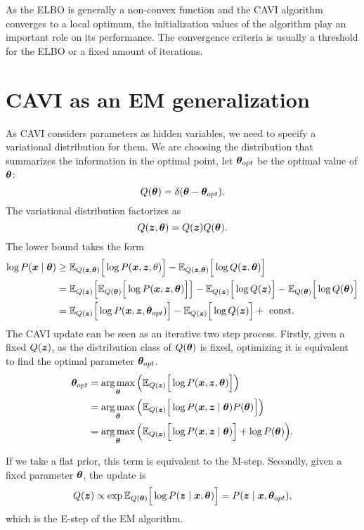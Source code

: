 As the ELBO is generally a non-convex function and the CAVI algorithm converges to a local optimum, the initialization values of the algorithm play an important role on its performance. The convergence criteria is usually a threshold for the ELBO or a fixed amount of iterations.

\section{CAVI as an EM generalization}\label{sec:CAVI_EM}

As CAVI considers parameters as hidden variables, we need to specify a variational distribution for them. We are choosing the distribution that summarizes the information in the optimal point, let \(\bm{\theta}_{opt}\) be the optimal value of \(\bm{\theta}\):
\[
  Q(\bm{\theta}) = \delta(\bm{\theta} - \bm{\theta}_{opt}).
\]
The variational distribution factorizes as
\[
  Q(\bm{z}, \bm{\theta}) = Q(\bm{z})Q(\bm{\theta}).
\]
The lower bound takes the form
\[
  \begin{aligned}
    \log{P(\bm{x}\mid \bm{\theta})} &\geq \mathbb{E}_{Q(\bm{z}, \bm{\theta})}\Big[\log{P(\bm{x}, \bm{z}, \theta)}\Big] - \mathbb{E}_{Q(\bm{z}, \bm{\theta})}\Big[\log{Q(\bm{z}, \bm{\theta})}\Big] \\
    &= \mathbb{E}_{Q(\bm{z})}\Big[\mathbb{E}_{Q(\bm{\theta})}\Big[\log{P(\bm{x}, \bm{z}, \bm{\theta})}\Big]\Big] - \mathbb{E}_{Q(\bm{z})}\Big[\log{Q(\bm{z})}\Big] - \mathbb{E}_{Q(\bm{\theta})}\Big[\log{Q(\bm{\theta})}\Big] \\
    &= \mathbb{E}_{Q(\bm{z})}\Big[\log{P(\bm{x}, \bm{z}, \bm{\theta}_{opt})}\Big] - \mathbb{E}_{Q(\bm{z})}\Big[\log{Q(\bm{z})}\Big] + \text{ const. }
  \end{aligned}
\]
The CAVI update can be seen as an iterative two step process. Firstly, given a fixed \(Q(\bm{z})\), as the distribution class of \(Q(\bm{\theta})\) is fixed, optimizing it is equivalent to find the optimal parameter \(\bm{\theta}_{opt}\). 
\[
  \begin{aligned}
    \bm{\theta}_{opt} &= \operatorname*{arg\,max}_{\bm{\theta}} \Big( \mathbb{E}_{Q(\bm{z})}\Big[\log{P(\bm{x},\bm{z},\bm{\theta})}\Big] \Big)\\
    &=  \operatorname*{arg\,max}_{\bm{\theta}} \Big( \mathbb{E}_{Q(\bm{z})}\Big[\log{P(\bm{x}, \bm{z}\mid \bm{\theta})P(\bm{\theta})}\Big] \Big) \\
    &= \operatorname*{arg\,max}_{\bm{\theta}} \Big( \mathbb{E}_{Q(\bm{z})}\Big[\log{P(\bm{x}, \bm{z}\mid \bm{\theta})}\Big] + \log{P(\bm{\theta})} \Big). \\
  \end{aligned}
\]

If we take a flat prior, this term is equivalent to the M-step. Secondly, given a fixed parameter \(\bm{\theta}\), the update is
\[
  Q(\bm{z}) \propto \exp \mathbb{E}_{Q(\bm{\theta})}\Big[\log P(\bm{z} \mid \bm{x}, \bm{\theta})\Big] =  P(\bm{z} \mid \bm{x}, \bm{\theta}_{opt}),
\]
which is the E-step of the EM algorithm.
